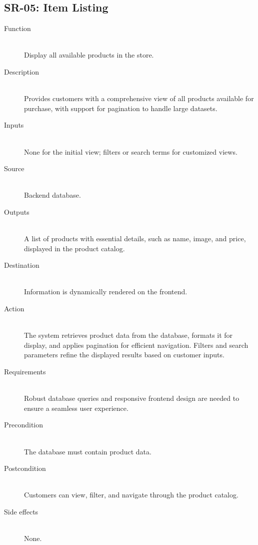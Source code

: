 \documentclass[a4paper,journal]{IEEEtran}
\begin{document}
\subsection{SR-05: Item Listing}
\begin{description}
  \item[Function] \hfill \\
    Display all
  available products in the store.
  \item[Description] \hfill \\
    Provides customers with a comprehensive view of all
  products available for purchase, with support for pagination to handle large
  datasets.
  \item[Inputs] \hfill \\
    None for the initial view; filters or search terms
  for customized views.
  \item[Source] \hfill \\
    Backend database.
  \item[Outputs] \hfill \\
    A list of products with essential details, such as
  name, image, and price, displayed in the product catalog.
  \item[Destination] \hfill \\
    Information is dynamically rendered on the frontend.
  \item[Action] \hfill \\
    The system retrieves product data from the database,
  formats it for display, and applies pagination for efficient navigation.
  Filters and search parameters refine the displayed results based on customer
  inputs.
  \item[Requirements] \hfill \\
    Robust database queries and responsive frontend
  design are needed to ensure a seamless user experience.
  \item[Precondition] \hfill \\
    The database must contain product data.
  \item[Postcondition] \hfill \\
    Customers can view, filter, and navigate through the
    product catalog.
  \item[Side effects] \hfill \\
    None.
\end{description}
\end{document}

